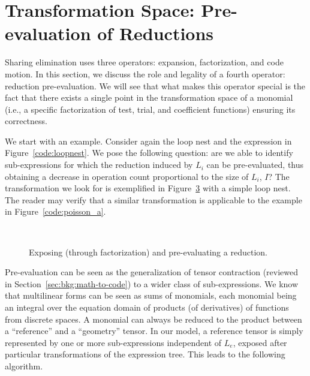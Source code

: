 \clearpage

\section{Transformation Space: Pre-evaluation of Reductions}
\label{sec:pre-evaluation}
Sharing elimination uses three operators: expansion, factorization, and code motion. In this section, we discuss the role and legality of a fourth operator: reduction pre-evaluation. We will see that what makes this operator special is the fact that there exists a single point in the transformation space of a monomial (i.e., a specific factorization of test, trial, and coefficient functions) ensuring its correctness.

We start with an example. Consider again the loop nest and the expression in Figure~\ref{code:loopnest}. We pose the following question: are we able to identify sub-expressions for which the reduction induced by $L_i$ can be pre-evaluated, thus obtaining a decrease in operation count proportional to the size of $L_i$, $I$? The transformation we look for is exemplified in Figure~\ref{code:loopnest_rednored} with a simple loop nest. The reader may verify that a similar transformation is applicable to the example in Figure~\ref{code:poisson_a}.

\begin{figure}[h]
\begin{CenteredBox}

\begin{subfigure}{0.42\textwidth}

\label{code:loopnest_red}
\end{subfigure}
~~~~~~~
\begin{subfigure}{0.40\textwidth}

\label{code:loopnest_nored}
\end{subfigure}

\end{CenteredBox}
\caption{Exposing (through factorization) and pre-evaluating a reduction.}\label{code:loopnest_rednored}
\end{figure}

Pre-evaluation can be seen as the generalization of tensor contraction (reviewed in Section~\ref{sec:bkg:math-to-code}) to a wider class of sub-expressions. We know that multilinear forms can be seen as sums of monomials, each monomial being an integral over the equation domain of products (of derivatives) of functions from discrete spaces. A monomial can always be reduced to the product between a ``reference'' and a ``geometry'' tensor. In our model, a reference tensor is simply represented by one or more sub-expressions independent of $L_e$, exposed after particular transformations of the expression tree. This leads to the following algorithm. 

